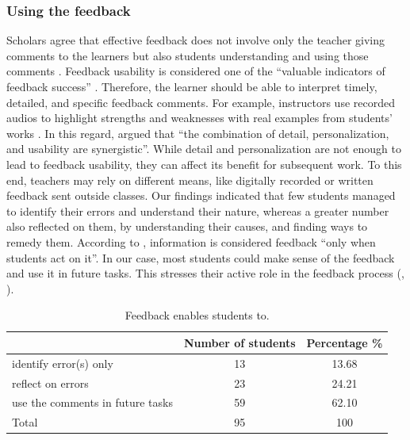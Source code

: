 \documentclass[english]{textolivre}
\begin{document}
\subsubsection{Using the feedback}
Scholars agree that effective feedback does not involve only the teacher giving comments to the learners but also students understanding and using those comments \cite{carless_development_2018,ryan_feedback_2019}. Feedback usability is considered one of the “valuable indicators of feedback success” \cite[p. 1519]{ryan_feedback_2019}. Therefore, the learner should be able to interpret timely, detailed, and specific feedback comments. For example, instructors use recorded audios to highlight strengths and weaknesses with real examples from students’ works \cite{henderson_conditions_2019}. In this regard, \textcite[p. 1509]{ryan_feedback_2019} argued that “the combination of detail, personalization, and usability are synergistic”. While detail and personalization are not enough to lead to feedback usability, they can affect its benefit for subsequent work. To this end, teachers may rely on different means, like digitally recorded or written feedback sent outside classes.  Our findings indicated that few students managed to identify their errors and understand their nature, whereas a greater number also reflected on them, by understanding their causes, and finding ways to remedy them. According to \textcite[p. 1322]{carless_development_2018}, information is considered feedback “only when students act on it”. In our case, most students could make sense of the feedback and use it in future tasks. This stresses their active role in the feedback process (, ).

\begin{table}[h!]
\centering
\begin{threeparttable}
\caption{Feedback enables students to.}
\label{tbl6}
\centering
\begin{tabular}{p{} c c}
\toprule
 & Number of students & Percentage \% \\ \midrule
identify error(s) only & 13 & 13.68 \\
reflect on errors & 23 & 24.21 \\
use the comments in  future tasks & 59 & 62.10 \\
Total & 95 & 100 \\
\bottomrule
\end{tabular}
\end{threeparttable}
\end{table}
\end{document}
